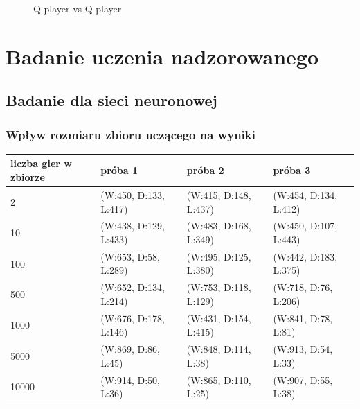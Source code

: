 \documentclass{article}
\begin{document}
\begin{figure}[H]
  \centering
  \caption{Q-player vs Q-player}
  \label{fig:q_player_vs_q_player}
\end{figure}

\section{Badanie uczenia nadzorowanego}

\subsection{Badanie dla sieci neuronowej}

\subsubsection{Wpływ rozmiaru zbioru uczącego na wyniki}

\begin{center}
  \begin{tabular}{|l|l|l|l|}
    \hline
    liczba gier w zbiorze & próba 1 & próba 2 & próba 3 \\ \hline
    2 & (W:450, D:133, L:417) & (W:415, D:148, L:437) & (W:454, D:134, L:412) \\ \hline
    10 & (W:438, D:129, L:433) & (W:483, D:168, L:349) & (W:450, D:107, L:443) \\ \hline
    100 & (W:653, D:58, L:289) & (W:495, D:125, L:380) & (W:442, D:183, L:375) \\ \hline
    500 & (W:652, D:134, L:214) & (W:753, D:118, L:129) & (W:718, D:76, L:206) \\ \hline
    1000 & (W:676, D:178, L:146) & (W:431, D:154, L:415) & (W:841, D:78, L:81) \\ \hline
    5000 & (W:869, D:86, L:45) & (W:848, D:114, L:38) & (W:913, D:54, L:33) \\ \hline
    10000 & (W:914, D:50, L:36) & (W:865, D:110, L:25) & (W:907, D:55, L:38) \\ \hline
  \end{tabular}
\end{center}
\end{document}
